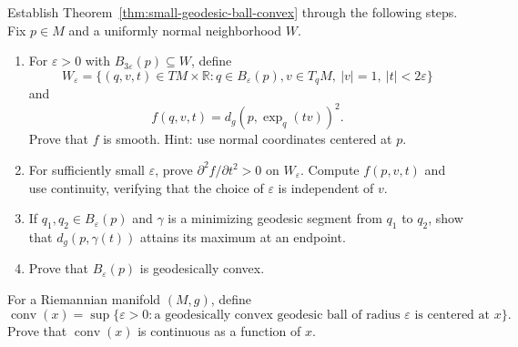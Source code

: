 \begin{exercise}
\label{prob:geodesic-ball-convexity}

Establish Theorem~\ref{thm:small-geodesic-ball-convex} through the following
steps.  Fix $p\in M$ and a uniformly normal neighborhood $W$.
\begin{enumerate}
\item[(a)] For $\varepsilon>0$ with $B_{3\varepsilon}(p)\subseteq W$, define
\[
W_\varepsilon=\{(q,v,t)\in TM\times\mathbb R:q\in B_\varepsilon(p),
v\in T_qM,\ |v|=1,\ |t|<2\varepsilon\}
\]
and
\[
f(q,v,t)=d_g(p,\exp_q(tv))^2.
\]
Prove that $f$ is smooth.  Hint: use normal coordinates centered at $p$.
\item[(b)] For sufficiently small $\varepsilon$, prove
$\partial^2f/\partial t^2>0$ on $W_\varepsilon$.  Compute $f(p,v,t)$ and
use continuity, verifying that the choice of $\varepsilon$ is independent of
$v$.
\item[(c)] If $q_1,q_2\in B_\varepsilon(p)$ and $\gamma$ is a minimizing
geodesic segment from $q_1$ to $q_2$, show that
$d_g(p,\gamma(t))$ attains its maximum at an endpoint.
\item[(d)] Prove that $B_\varepsilon(p)$ is geodesically convex.
\end{enumerate}
\end{exercise}

\begin{exercise}
\label{prob:convexity-radius-continuous}

For a Riemannian manifold $(M,g)$, define
\[
\operatorname{conv}(x)=\sup\{\varepsilon>0:\text{a geodesically convex
geodesic ball of radius }\varepsilon\text{ is centered at }x\}.
\]
Prove that $\operatorname{conv}(x)$ is continuous as a function of $x$.
\end{exercise}


